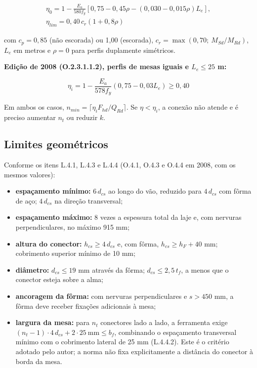 \begin{gather*}
  \eta_0 = 1 - \frac{E_a}{580 f_y}\left[0{,}75 - 0{,}45\rho - (0{,}030 - 0{,}015\rho) L_e\right], \\
  \eta_{lim} = 0{,}40\, c_r (1 + 0{,}8\rho)
\end{gather*}

com $c_p = 0{,}85$ (não escorada) ou 1,00 (escorada), $c_r = \max(0{,}70;\ M_{Sd}/M_{Rd})$, $L_e$ em metros e $\rho = 0$ para perfis duplamente simétricos.

\textbf{Edição de 2008 (O.2.3.1.1.2), perfis de mesas iguais e $L_e \le 25$ m:}

\[
  \eta_i = 1 - \frac{E_a}{578 f_y}(0{,}75 - 0{,}03 L_e) \ge 0{,}40
\]

Em ambos os casos, $n_{min} = \lceil \eta_i F_{hd} / Q_{Rd} \rceil$. Se $\eta < \eta_i$, a conexão não atende e é preciso aumentar $n_t$ ou reduzir $k$.

\subsection{Limites geométricos}\label{sec:2.5.6}
Conforme os itens L.4.1, L.4.3 e L.4.4 (O.4.1, O.4.3 e O.4.4 em 2008, com os mesmos valores):
\begin{itemize}
\item \textbf{espaçamento mínimo:} $6\,d_{cs}$ ao longo do vão, reduzido para $4\,d_{cs}$ com fôrma de aço; $4\,d_{cs}$ na direção transversal;
\item \textbf{espaçamento máximo:} $8$ vezes a espessura total da laje e, com nervuras perpendiculares, no máximo 915 mm;
\item \textbf{altura do conector:} $h_{cs} \ge 4\,d_{cs}$ e, com fôrma, $h_{cs} \ge h_F + 40$ mm; cobrimento superior mínimo de 10 mm;
\item \textbf{diâmetro:} $d_{cs} \le 19$ mm através da fôrma; $d_{cs} \le 2{,}5\,t_f$, a menos que o conector esteja sobre a alma;
\item \textbf{ancoragem da fôrma:} com nervuras perpendiculares e $s > 450$ mm, a fôrma deve receber fixações adicionais à mesa;
\item \textbf{largura da mesa:} para $n_t$ conectores lado a lado, a ferramenta exige $(n_t - 1)\cdot 4\,d_{cs} + 2 \cdot 25\ \text{mm} \le b_f$, combinando o espaçamento transversal mínimo com o cobrimento lateral de 25 mm (L.4.4.2). Este é o critério adotado pelo autor; a norma não fixa explicitamente a distância do conector à borda da mesa.
\end{itemize}

